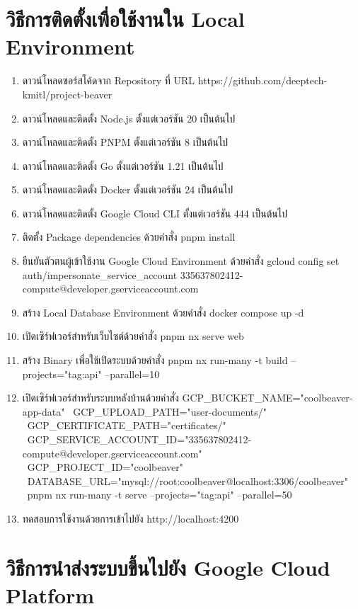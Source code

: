 \chapter{วิธีการติดตั้งเพื่อใช้งานใน Local Environment}

\begin{enumerate}
	\item ดาวน์โหลดซอร์สโค้ดจาก Repository ที่ URL https://github.com/deeptech-kmitl/project-beaver
	\item ดาวน์โหลดและติดตั้ง Node.js ตั้งแต่เวอร์ชัน 20 เป็นต้นไป
	\item ดาวน์โหลดและติดตั้ง PNPM ตั้งแต่เวอร์ชัน 8 เป็นต้นไป
	\item ดาวน์โหลดและติดตั้ง Go ตั้งแต่เวอร์ชัน 1.21 เป็นต้นไป
	\item ดาวน์โหลดและติดตั้ง Docker ตั้งแต่เวอร์ชัน 24 เป็นต้นไป
	\item ดาวน์โหลดและติดตั้ง Google Cloud CLI ตั้งแต่เวอร์ชัน 444 เป็นต้นไป
	\item ติดตั้ง Package dependencies ด้วยคำสั่ง pnpm install
	\item ยืนยันตัวตนผู้เข้าใช้งาน Google Cloud Environment ด้วยคำสั่ง gcloud config set auth/impersonate\_service\_account 335637802412-compute@developer.gserviceaccount.com
	\item สร้าง Local Database Environment ด้วยคำสั่ง docker compose up -d
	\item เปิดเซิร์ฟเวอร์สำหรับเว็บไซต์ด้วยคำสั่ง pnpm nx serve web
	\item สร้าง Binary เพื่อใช้เปิดระบบด้วยคำสั่ง pnpm nx run-many -t build --projects="tag:api" --parallel=10
	\item เปิดเซิร์ฟเวอร์สำหรับระบบหลังบ้านด้วยคำสั่ง
		GCP\_BUCKET\_NAME="coolbeaver-app-data" \
		GCP\_UPLOAD\_PATH="user-documents/" \
		GCP\_CERTIFICATE\_PATH="certificates/" \
		GCP\_SERVICE\_ACCOUNT\_ID="335637802412-compute@developer.gserviceaccount.com" \
		GCP\_PROJECT\_ID="coolbeaver" \
		DATABASE\_URL="mysql://root:coolbeaver@localhost:3306/coolbeaver" \
		pnpm nx run-many -t serve --projects="tag:api" --parallel=50
	\item ทดสอบการใช้งานด้วยการเข้าไปยัง http://localhost:4200
\end{enumerate}

\chapter{วิธีการนำส่งระบบขึ้นไปยัง Google Cloud Platform}

